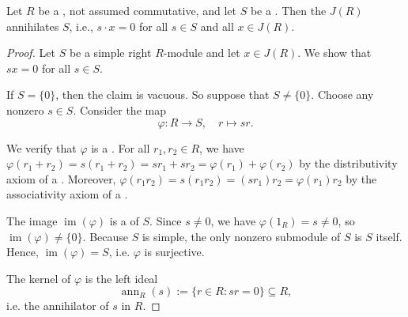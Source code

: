 \begin{proposition}  \label{proposition:jacobson_radical_annihilates_every_simple_right_module_over_a_ring}

	Let $R$ be a , not assumed commutative, and let $S$ be a  . Then the  $J(R)$ annihilates $S$, i.e., $s \cdot x = 0$ for all $s \in S$ and all $x \in J(R)$.
\end{proposition}

\begin{proof}

    Let $S$ be a simple right $R$-module and let $x \in J(R)$. We show that $sx = 0$ for all $s \in S$.

    If $S = \{0\}$, then the claim is vacuous. So suppose that $S \neq \{0\}$. Choose any nonzero $s \in S$. Consider the map
    $$\varphi: R \longrightarrow S, \quad r \longmapsto sr.$$

    We verify that $\varphi$ is a . For all $r_1, r_2 \in R$, we have $\varphi(r_1 + r_2) = s(r_1 + r_2) = sr_1 + sr_2 = \varphi(r_1) + \varphi(r_2)$ by the distributivity axiom of a . Moreover, $\varphi(r_1 r_2) = s(r_1 r_2) = (sr_1) r_2 = \varphi(r_1) r_2$ by the associativity axiom of a .

    The image $\operatorname{im}(\varphi)$ is a  of $S$. Since $s \neq 0$, we have $\varphi(1_R) = s \neq 0$, so $\operatorname{im}(\varphi) \neq \{0\}$. Because $S$ is simple, the only nonzero submodule of $S$ is $S$ itself. Hence, $\operatorname{im}(\varphi) = S$, i.e. $\varphi$ is surjective.

    The kernel of $\varphi$ is the left ideal
    $$\operatorname{ann}_R(s) := \{r \in R : sr = 0\} \subseteq R,$$
    i.e. the annihilator of $s$ in $R$.


\end{proof}
